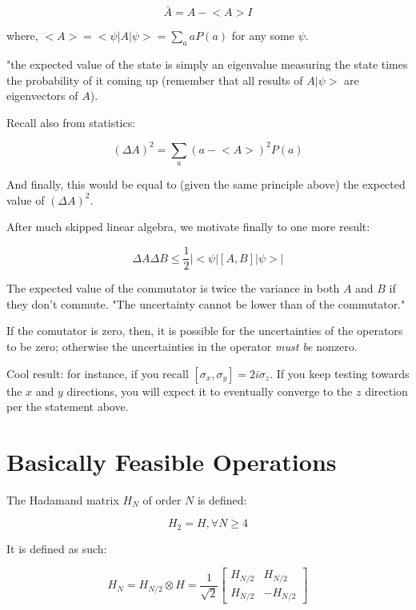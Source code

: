 \documentclass[letterpaper]{article}
\begin{document}
\begin{equation}
   \bar{A} = A- \big<A\big> I 
\end{equation}

where, \(\big<A\big> = \big<\psi|A|\psi\big> = \sum_a aP(a)\) for any some \(\psi\).

"the expected value of the state is simply an eigenvalue measuring the state times the probability of it coming up (remember that all results of \(A|\psi\big>\) are eigenvectors of \(A\)).

Recall also from statistics:

\begin{equation}
   (\Delta A)^2 = \sum_a  (a- \big<A\big>)^2 P(a) 
\end{equation}

And finally, this would be equal to (given the same principle above) the expected value of \((\Delta A)^2\).

After much skipped linear algebra, we motivate finally to one more result: 

\begin{equation}
   \Delta A \Delta B \leq \frac{1}{2} |\big<\psi|[A,B] |\psi\big>|
\end{equation}

The expected value of the commutator is twice the variance in both \(A\) and \(B\) if they don't commute. "The uncertainty cannot be lower than of the commutator."

If the comutator is zero, then, it is possible for the uncertainties of the operators to be zero; otherwise the uncertainties in the operator \emph{must be} nonzero.

Cool result: for instance, if you recall \([\sigma_x, \sigma_y] = 2 i\sigma_z\). If you keep testing towards the \(x\) and \(y\) directions, you will expect it to eventually converge to the \(z\) direction per the statement above.

\section{Basically Feasible Operations}
\label{sec:org3b07d05}
The Hadamand matrix \(H_N\) of order \(N\) is defined:

\begin{equation}
    H_2 = H, \forall N \geq 4
\end{equation}

It is defined as such:

\begin{equation}
   H_N = H_{N/2} \otimes H = \frac{1}{\sqrt{2}} \begin{bmatrix}
H_{N/2} & H_{N/2} \\
H_{N/2} & -H_{N/2} 
\end{bmatrix}
\end{equation}
\end{document}
